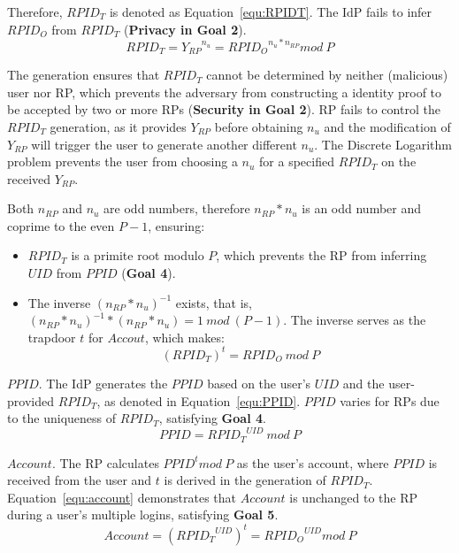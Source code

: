 Therefore, $RPID_T$ is denoted as Equation~\ref{equ:RPIDT}. The IdP fails to infer ${RPID_O}$ from $RPID_T$ (\textbf{Privacy in Goal 2}).
   \begin{equation}
   RPID_T = {Y_{RP}}^{n_{u}} = {RPID_O}^{n_{u}* n_{RP}} mod \ P
   \label{equ:RPIDT}
   \end{equation}

The generation ensures that $RPID_T$ cannot be determined by neither (malicious) user nor RP, which prevents the adversary from constructing a identity proof to be accepted by two or more RPs (\textbf{Security in Goal 2}). RP fails to control the $RPID_T$ generation, as it provides $Y_{RP}$ before obtaining $n_{u}$ and the modification of $Y_{RP}$ will trigger the user to generate another different  $n_{u}$. The Discrete Logarithm problem prevents the user from choosing a $n_{u}$ for a specified $RPID_T$ on the received $Y_{RP}$.

Both $n_{RP}$ and $n_{u}$ are odd numbers, therefore $n_{RP}*n_{u}$ is an odd number and coprime to the even $P-1$, ensuring:
 \begin{itemize}
   \item $RPID_T$ is a primite root modulo $P$, which prevents the RP from inferring $UID$ from $PPID$ (\textbf{Goal 4}).
   \item The inverse $(n_{RP}*n_{u})^{-1}$ exists, that is, $(n_{RP}*n_{u})^{-1} * (n_{RP}*n_{u}) = 1 \ mod \ (P-1)$. The inverse  serves as  the trapdoor $t$ for $Accout$, which makes:
   \begin{equation}
   (RPID_T)^t = RPID_O \ mod \ P
   \label{equ:trapdoor}
   \end{equation}
 \end{itemize}

{$PPID$}. The IdP generates the $PPID$ based on the user's $UID$ and the user-provided $RPID_T$, as denoted in Equation~\ref{equ:PPID}. $PPID$ varies for RPs due to the uniqueness of $RPID_T$, satisfying \textbf{Goal 4}.
 \begin{equation}
   PPID = {RPID_T}^{UID} \ mod \ P
   \label{equ:PPID}
   \end{equation}

{$Account$}. The RP calculates $PPID^t mod \ P$ as the  user's account, where $PPID$ is received from the user and $t$ is derived in the generation of $RPID_T$. Equation~\ref{equ:account} demonstrates that $Account$ is unchanged to the RP during a user's multiple logins, satisfying \textbf{Goal 5}.
 \begin{equation}
   Account = ({RPID_T}^{UID})^t = {RPID_O}^{UID} mod \ P
   \label{equ:account}
   \end{equation}


